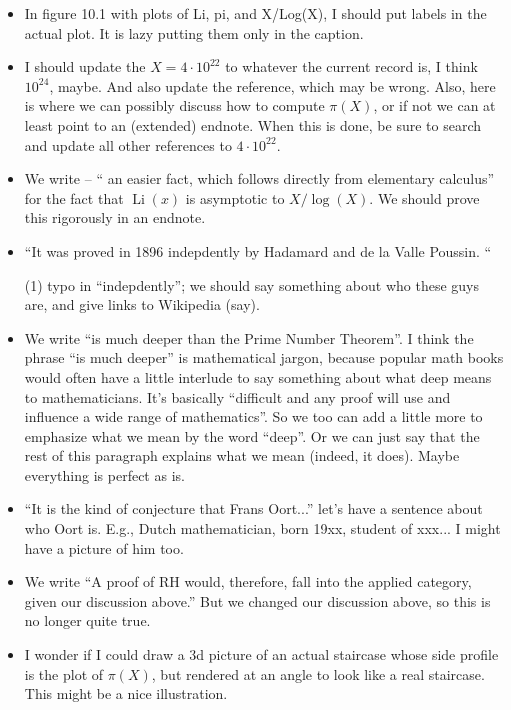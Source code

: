 \documentclass{article}
\DeclareMathOperator{\Li}{Li}
\begin{document}
\begin{itemize}
\item In figure 10.1 with plots of Li, pi, and X/Log(X), I should
put labels in the actual plot.  It is lazy putting them only
in the caption.

\item I should update the $X=4\cdot 10^{22}$ to whatever
the current record is, I think $10^{24}$, maybe.  And also update
the reference, which may be wrong.  Also, here is where we can possibly
discuss how to compute $\pi(X)$, or if not we can at least point
to an (extended) endnote.  When this is done, be sure to search and
update all other references to $4\cdot 10^{22}$.

\item We write -- `` an easier fact, which follows directly from
  elementary calculus'' for the fact that $\Li(x)$ is asymptotic to
  $X/\log(X)$. We should prove this rigorously in an endnote.

\item ``It was proved in 1896 indepdently by Hadamard and de la Valle Poussin. ``

(1) typo in  ``indepdently'';  we should say something about who these guys are, 
and give links to Wikipedia (say).

\item We write ``is much deeper than the Prime Number Theorem''.  I
  think the phrase ``is much deeper'' is mathematical jargon, because
  popular math books would often have a little interlude to say
  something about what deep means to mathematicians.  It's basically
  ``difficult and any proof will use and influence a wide range of
  mathematics''.  So we too can add a little more to emphasize what we
  mean by the word ``deep''.  Or we can just say that the rest of this
  paragraph explains what we mean (indeed, it does).  Maybe everything
  is perfect as is.

\item ``It is the kind of conjecture that Frans Oort...'' let's have a
  sentence about who Oort is.  E.g., Dutch mathematician, born 19xx,
  student of xxx...  I might have a picture of him too.  

\item We write ``A proof of RH would, therefore, fall into the applied
  category, given our discussion above.'' But we changed our
  discussion above, so this is no longer quite true.

\item I wonder if I could draw a 3d picture of an actual staircase
  whose side profile is the plot of $\pi(X)$, but rendered at an angle
  to look like a real staircase.  This might be a nice illustration.


\end{itemize}
\end{document}
